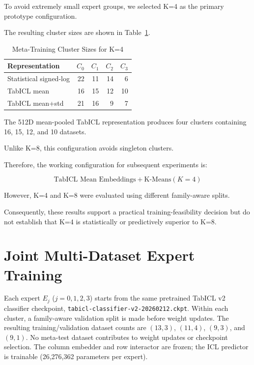 \documentclass[conference]{IEEEtran}
\begin{document}
To avoid extremely small expert groups, we selected K=4 as the primary prototype configuration.

The resulting cluster sizes are shown in Table~\ref{tab:k4}.

\begin{table}[t]
\caption{Meta-Training Cluster Sizes for K=4}
\label{tab:k4}
\centering
\footnotesize
\begin{tabular}{lrrrr}
\toprule
Representation & $C_0$ & $C_1$ & $C_2$ & $C_3$\\
\midrule
Statistical signed-log & 22 & 11 & 14 & 6\\
TabICL mean & 16 & 15 & 12 & 10\\
TabICL mean+std & 21 & 16 & 9 & 7\\
\bottomrule
\end{tabular}
\end{table}

The 512D mean-pooled TabICL representation produces four clusters containing 16, 15, 12, and 10 datasets.

Unlike K=8, this configuration avoids singleton clusters.

Therefore, the working configuration for subsequent experiments is:

\begin{equation}
\boxed{
\text{TabICL Mean Embeddings}
+
\text{K-Means}(K=4)
}
\end{equation}

However, K=4 and K=8 were evaluated using different family-aware splits.

Consequently, these results support a practical training-feasibility decision but do not establish that K=4 is statistically or predictively superior to K=8.

\section{Joint Multi-Dataset Expert Training}
Each expert $E_j$ ($j=0,1,2,3$) starts from the same pretrained TabICL v2 classifier checkpoint, \texttt{tabicl-classifier-v2-20260212.ckpt}. Within each cluster, a family-aware validation split is made before weight updates. The resulting training/validation dataset counts are $(13,3)$, $(11,4)$, $(9,3)$, and $(9,1)$. No meta-test dataset contributes to weight updates or checkpoint selection. The column embedder and row interactor are frozen; the ICL predictor is trainable (26,276,362 parameters per expert).
\end{document}
